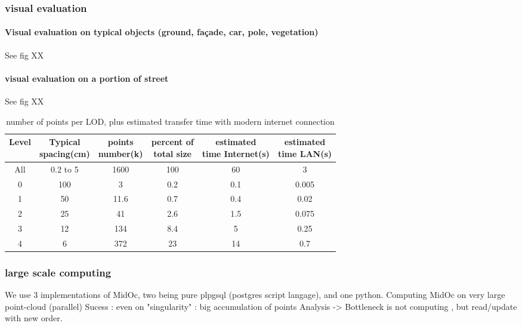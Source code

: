 		\subsubsection{visual evaluation}
			\paragraph{Visual evaluation on typical objects (ground, façade, car, pole, vegetation)}
				See fig XX 
			
			\paragraph{visual evaluation on a portion of street}			
				See fig XX 
				\begin{table}[ht]
					\centering
					\caption{ number of points per LOD, plus estimated transfer time with modern internet connection}
					\scriptsize 
					\begin{tabular}{|c|c|c|c|c|c}
					\hline Level & \shortstack{Typical \\ spacing(cm)} & \shortstack{ points \\ number(k)} & \shortstack{percent of \\ total size} & \shortstack{estimated \\ time Internet(s)} & \shortstack{estimated \\ time LAN(s)} \\
					\hline All & 0.2 to 5  & 1600 & 100 & 60 & 3 \\ 
					\hline 0 & 100 & 3 & 0.2 & 0.1 & 0.005\\ 
					\hline 1 & 50 & 11.6 & 0.7 & 0.4 & 0.02\\ 
					\hline 2 & 25 & 41 & 2.6 & 1.5 & 0.075\\ 
					\hline 3 & 12 & 134 & 8.4 & 5 & 0.25\\ 
					\hline 4 & 6 & 372 & 23 & 14 & 0.7\\  
					
					\hline 
					\end{tabular} 
				\end{table}
			
			 
		\subsubsection{large scale computing}
			We use 3 implementations of MidOc, two being pure plpgsql (postgres script langage), and one python.
			Computing MidOc on very large point-cloud (parallel)
			Sucess : even on "singularity" : big accumulation of points
			Analysis -> Bottleneck is not computing , but read/update with new order. 
